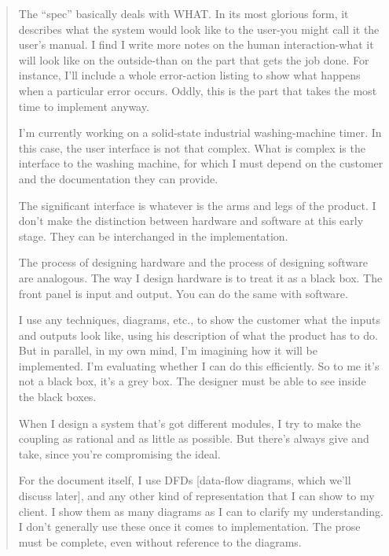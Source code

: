 \begin{quotation}
\noindent The ``spec'' basically deals with WHAT. In its most glorious form, it
describes what the system would look like to the user-you might call it the
user's manual. I find I write more notes on the human interaction-what it
will look like on the outside-than on the part that gets the job done. For
instance, I'll include a whole error-action listing to show what happens when
a particular error occurs. Oddly, this is the part that takes the most time to
implement anyway.


I'm currently working on a solid-state industrial washing-machine timer. In
this case, the user interface is not that complex. What is complex is the
interface to the washing machine, for which I must depend on the customer
and the documentation they can provide.

The significant interface is whatever is the arms and legs of the product. I
don't make the distinction between hardware and software at this early
stage. They can be interchanged in the implementation.

The process of designing hardware and the process of designing software
are analogous. The way I design hardware is to treat it as a black box. The
front panel is input and output. You can do the same with software.

I use any techniques, diagrams, etc., to show the customer what the inputs
and outputs look like, using his description of what the product has to do.
But in parallel, in my own mind, I'm imagining how it will be implemented.
I'm evaluating whether I can do this efficiently. So to me it's not a black
box, it's a grey box. The designer must be able to see inside the black boxes.

When I design a system that's got different modules, I try to make the
coupling as rational and as little as possible. But there's always give and
take, since you're compromising the ideal.

For the document itself, I use DFDs {[}data-flow diagrams, which we'll
discuss later{]}, and any other kind of representation that I can show to my
client. I show them as many diagrams as I can to clarify my understanding.
I don't generally use these once it comes to implementation. The prose
must be complete, even without reference to the diagrams.
\end{quotation}
\blackline{2ex}

